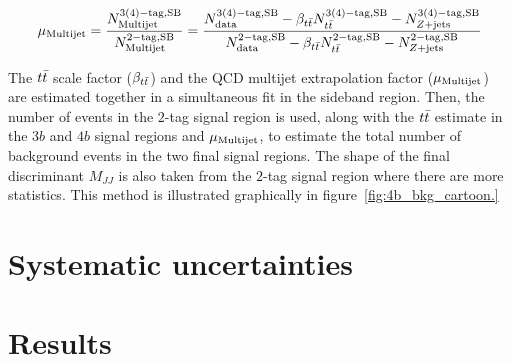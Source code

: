 \begin{equation}
\label{eqn:4bmu}
\mu_{\rm Multijet} = \frac{N_{\rm Multijet}^{\rm 3(4)-tag, SB}}{N_{\rm Multijet}^{\rm 2-tag, SB}} = \frac{N_{\rm data}^{\rm 3(4)-tag, SB} - \beta_{t\bar{t}} N_{t\bar{t}}^{\rm 3(4)-tag, SB} - N_{Z+ \rm jets}^{\rm 3(4)-tag, SB}}{N_{\rm data}^{\rm 2-tag, SB} - \beta_{t\bar{t}} N_{t\bar{t}}^{\rm 2-tag, SB} - N_{Z+ \rm jets}^{\rm 2-tag, SB}}
\end{equation}

The $t\bar{t}$ scale factor ($\beta_{t\bar{t}}$) and the QCD multijet extrapolation factor ($\mu_{\rm Multijet}$) are estimated together in a simultaneous fit in the sideband region. Then, the number of events in the $2$-tag signal region is used, along with the $t\bar{t}$ estimate in the $3b$ and $4b$ signal regions and $\mu_{\rm Multijet}$, to estimate the total number of background events in the two final signal regions. The shape of the final discriminant $M_{JJ}$ is also taken from the $2$-tag signal region where there are more statistics. This method is illustrated graphically in figure~\ref{fig:4b_bkg_cartoon.}


\section{Systematic uncertainties}

\section{Results}


